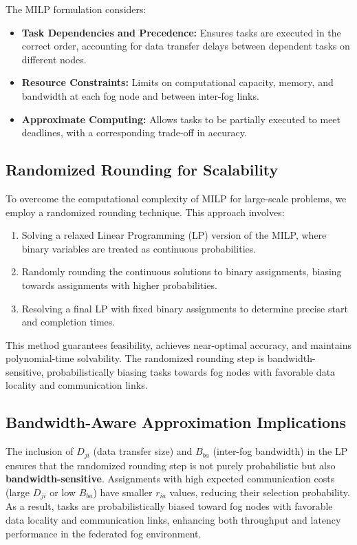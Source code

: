 \documentclass[conference]{IEEEtran}
\begin{document}
The MILP formulation considers:
\begin{itemize}
    \item \textbf{Task Dependencies and Precedence:} Ensures tasks are executed in the correct order, accounting for data transfer delays between dependent tasks on different nodes.
    \item \textbf{Resource Constraints:} Limits on computational capacity, memory, and bandwidth at each fog node and between inter-fog links.
    \item \textbf{Approximate Computing:} Allows tasks to be partially executed to meet deadlines, with a corresponding trade-off in accuracy.
\end{itemize}

\subsection{Randomized Rounding for Scalability}

To overcome the computational complexity of MILP for large-scale problems, we employ a randomized rounding technique. This approach involves:
\begin{enumerate}
    \item Solving a relaxed Linear Programming (LP) version of the MILP, where binary variables are treated as continuous probabilities.
    \item Randomly rounding the continuous solutions to binary assignments, biasing towards assignments with higher probabilities.
    \item Resolving a final LP with fixed binary assignments to determine precise start and completion times.
\end{enumerate}

This method guarantees feasibility, achieves near-optimal accuracy, and maintains polynomial-time solvability. The randomized rounding step is bandwidth-sensitive, probabilistically biasing tasks towards fog nodes with favorable data locality and communication links.

\subsection{Bandwidth-Aware Approximation Implications}

The inclusion of \( D_{ji} \) (data transfer size) and \( B_{ba} \) (inter-fog bandwidth) in the LP ensures that the randomized rounding step is not purely probabilistic but also \textbf{bandwidth-sensitive}. Assignments with high expected communication costs (large \( D_{ji} \) or low \( B_{ba} \)) have smaller \( r_{ia} \) values, reducing their selection probability. As a result, tasks are probabilistically biased toward fog nodes with favorable data locality and communication links, enhancing both throughput and latency performance in the federated fog environment.
\end{document}
